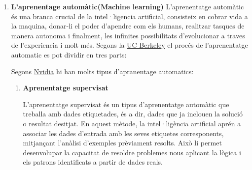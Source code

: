 \begin{enumerate}
    \item[] \textbf{L'aprenentage automàtic(Machine learning)}
    L'aprenentatge automàtic és una branca crucial de la intel·ligencia artificial, consisteix en cobrar vida a la maquina, donar-li el poder d'apendre com els humans, realitzar tasques de manera autonoma i finalment, les infinites possibilitats d'evolucionar a traves de l'experiencia i molt més. Segons la \href{https://ischoolonline.berkeley.edu/blog/what-is-machine-learning/}{UC Berkeley} el procés de l'aprenentatge automatic es pot dividir en tres parts:
       Segons \href{https://blogs.nvidia.com/blog/supervised-unsupervised-learning/}{Nvidia} hi han molts tipus d'apranentage automatics:
      \begin{enumerate}
       \item \hypertarget{Aprenentatge supervisat}{\textbf{Aprenentatge supervisat}}
       L'aprenentatge supervisat és un tipus d'aprenentatge automàtic que treballa amb dades etiquetades, és a dir, dades que ja inclouen la solució o resultat desitjat. En aquest mètode, la intel·ligència artificial aprén a associar les dades d'entrada amb les seves etiquetes corresponents, mitjançant l'anàlisi d'exemples prèviament resolts. Això li permet desenvolupar la capacitat de resoldre problemes nous aplicant la lògica i els patrons identificats a partir de dades reals. \\


\end{enumerate}
\end{enumerate}
